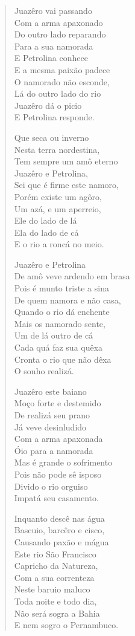 \begin{verse}
Juazêro vai passando\\
Com a arma apaxonado\\
Do outro lado reparando\\
Para a sua namorada\\
E Petrolina conhece\\
E a mesma paixão padece\\
O namorado não esconde,\\
Lá do outro lado do rio\\
Juazêro dá o picio\\
E Petrolina responde.

Que seca ou inverno\\
Nesta terra nordestina,\\
Tem sempre um amô eterno\\
Juazêro e Petrolina,\\
Sei que é firme este namoro,\\
Porém existe um agôro,\\
Um azá, e um aperreio,\\
Ele do lado de lá\\
Ela do lado de cá\\
E o rio a roncá no meio.

Juazêro e Petrolina\\
De amô veve ardendo em brasa\\
Pois é munto triste a sina\\
De quem namora e não casa,\\
Quando o rio dá enchente\\
Mais os namorado sente,\\
Um de lá outro de cá\\
Cada quá faz sua quêxa\\
Cronta o rio que não dêxa\\
O sonho realizá.

Juazêro este baiano\\
Moço forte e destemido\\
De realizá seu prano\\
Já veve desinludido\\
Com a arma apaxonada\\
Óio para a namorada\\
Mas é grande o sofrimento\\
Pois não pode sê isposo\\
Divido o rio orguiso\\
Impatá seu casamento.

Inquanto descê nas água\\
Bascuio, barcêro e cisco,\\
Causando paxão e mágua\\
Este rio São Francisco\\
Capricho da Natureza,\\
Com a sua correnteza\\
Neste baruio maluco\\
Toda noite e todo dia,\\
Não será sogra a Bahia\\
E nem sogro o Pernambuco.


\end{verse}
